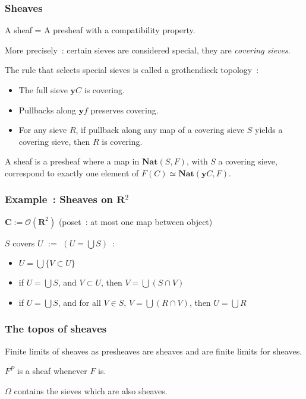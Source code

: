 \documentclass{beamer}
\newcommand{\0}{\boldsymbol{0}}
\newcommand{\1}{\boldsymbol{1}}
\begin{document}
\begin{frame}
    \frametitle{Sheaves}

    A sheaf = A presheaf with a compatibility property.
    \vspace{0.5cm}

    More precisely~: certain sieves are considered special, they are \emph{covering sieves}.

    The rule that selects special sieves is called a grothendieck topology~:

\begin{itemize}
    \item The full sieve $\mathbf{y}C$ is covering.
    \item Pullbacks along $\mathbf{y}f$ preserves covering.
    \item For any sieve $R$, if pullback along any map of a covering sieve $S$ yields a covering sieve, then $R$ is covering.
\end{itemize}
    \vspace{0.5cm}

    A sheaf is a presheaf where a map in $\mathbf{Nat}(S, F)$, with $S$ a covering sieve, correspond to exactly one element of $F(C)\simeq \mathbf{Nat}(\mathbf{y}C,F)$.
\end{frame}
\begin{frame}
    \frametitle{Example~: Sheaves on $\mathbf{R}^2$}

    $\textbf{C} := \mathcal{O}(\mathbf{R}^2)$ (poset~: at most one map between object)

    $S$ covers $U$ $:=$ $(U = \bigcup S)$~:
    \begin{itemize}
        \item $U = \bigcup \{V\subset U\}$
        \item if $U = \bigcup S$, and $V \subset U$, then $V = \bigcup (S\cap V)$
        \item if $U = \bigcup S$, and for all $V\in S$, $V = \bigcup (R\cap V)$, then $U = \bigcup R$
    \end{itemize}
\end{frame}

\begin{frame}
    \frametitle{The topos of sheaves}

    Finite limits of sheaves as presheaves are sheaves and are finite limits for sheaves.\vspace{1cm}

    $F^P$ is a sheaf whenever $F$ is.\vspace{1cm}
    
    $\Omega$ contains the sieves which are also sheaves.
\end{frame}
\end{document}
